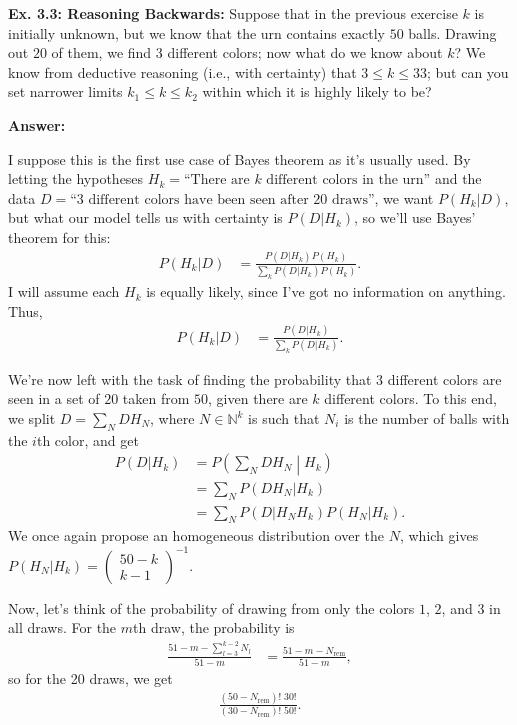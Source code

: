 \documentclass{article}
\begin{document}
\textbf{Ex. 3.3: Reasoning Backwards: }Suppose that in the previous exercise $k$ is initially unknown, but we know that the urn contains exactly $50$ balls. Drawing out $20$ of them, we find $3$ different colors; now what do we know about $k$? We know from deductive reasoning (i.e., with certainty) that $3\leq k\leq 33$; but can you set narrower limits $k_1\leq k\leq k_2$ within which it is highly likely to be?

\textbf{Answer:}

I suppose this is the first use case of Bayes theorem as it's usually used. By letting the hypotheses $H_k=\text{``There are $k$ different colors in the urn''}$ and the data $D=\text{``3 different colors have been seen after 20 draws''}$, we want $P(H_k|D)$, but what our model tells us with certainty is $P(D|H_k)$, so we'll use Bayes' theorem for this:
\begin{align}
	P(H_k|D)&=\frac{P(D|H_k)P(H_k)}{\sum_kP(D|H_k)P(H_k)}.
\end{align}
I will assume each $H_k$ is equally likely, since I've got no information on anything. Thus,
\begin{align}
	P(H_k|D)&=\frac{P(D|H_k)}{\sum_kP(D|H_k)}.
\end{align}

We're now left with the task of finding the probability that $3$ different colors are seen in a set of $20$ taken from $50$, given there are $k$ different colors. To this end, we split $D=\sum_NDH_N$, where $N\in\mathbb N^k$ is such that $N_i$ is the number of balls with the $i$th color, and get
\begin{align}
	P(D|H_k)&=P\left(\sum_NDH_N\middle|H_k\right)\\
	&=\sum_NP(DH_N|H_k)\\
	&=\sum_NP(D|H_NH_k)P(H_N|H_k).
\end{align}
We once again propose an homogeneous distribution over the $N$, which gives $P(H_N|H_k)=\begin{pmatrix}50-k\\k-1\end{pmatrix}^{-1}$.

Now, let's think of the probability of drawing from only the colors $1$, $2$, and $3$ in all draws. For the $m$th draw, the probability is
\begin{align}
	\frac{51-m-\sum_{l=3}^{k-2}N_l}{51-m}&=\frac{51-m-N_\text{rem}}{51-m},
\end{align}
so for the 20 draws, we get
\begin{align}
	\frac{\left(50-N_\text{rem}\right)!\;30!}{\left(30-N_\text{rem}\right)!\;50!}.
\end{align}
\end{document}
